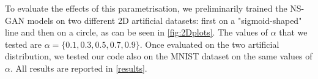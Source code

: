 To evaluate the effects of this parametrisation, we preliminarily trained the NS-GAN models on two different 2D artificial datasets: first on a "sigmoid-shaped" line and then on a circle, as can be seen in \ref{fig:2Dplots}.
The values of $\alpha$ that we tested are $\alpha = \{0.1,0.3,0.5,0.7,0.9\}$.
Once evaluated on the two artificial distribution, we tested our code also on the MNIST dataset on the same values of $\alpha$.
All results are reported in \ref{results}.
